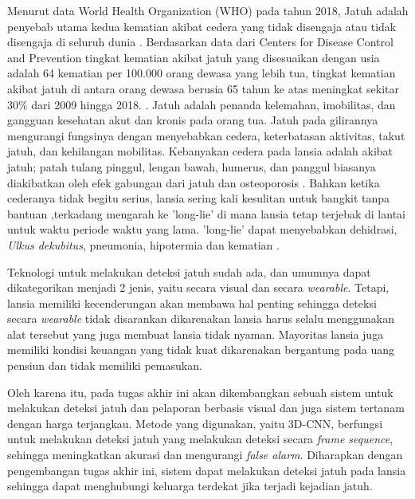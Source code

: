 Menurut data World Health Organization (WHO) pada tahun 2018, Jatuh adalah penyebab utama kedua kematian akibat cedera yang tidak disengaja atau tidak disengaja di seluruh dunia \cite{cit:5}. Berdasarkan data dari Centers for Disease Control and Prevention tingkat kematian akibat jatuh yang disesuaikan dengan usia adalah 64 kematian per 100.000 orang dewasa yang lebih tua, tingkat kematian akibat jatuh di antara orang dewasa berusia 65 tahun ke atas meningkat sekitar 30\% dari 2009 hingga 2018. \cite{cit:6}. Jatuh adalah penanda kelemahan, imobilitas, dan gangguan kesehatan akut dan kronis pada orang tua. Jatuh pada gilirannya mengurangi fungsinya dengan menyebabkan cedera, keterbatasan aktivitas, takut jatuh, dan kehilangan mobilitas. Kebanyakan cedera pada lansia adalah akibat jatuh; patah tulang pinggul, lengan bawah, humerus, dan panggul biasanya diakibatkan oleh efek gabungan dari jatuh dan osteoporosis \cite{cit:7}. Bahkan ketika cederanya tidak begitu serius, lansia sering kali kesulitan untuk bangkit tanpa bantuan \cite{cit:8},terkadang mengarah ke 'long-lie' di mana lansia tetap terjebak di lantai untuk waktu periode waktu yang lama. 'long-lie' dapat menyebabkan dehidrasi, \textit{Ulkus dekubitus}, pneumonia, hipotermia dan kematian \cite{cit:9}.
 \vspace{1ex} 

Teknologi untuk melakukan deteksi jatuh sudah ada, dan umumnya dapat dikategorikan menjadi 2 jenis, yaitu secara visual dan secara \textit{wearable}. Tetapi, lansia memiliki kecenderungan akan membawa hal penting sehingga deteksi secara \textit{wearable} tidak disarankan dikarenakan lansia harus selalu menggunakan alat tersebut yang juga membuat lansia tidak nyaman. Mayoritas lansia juga memiliki kondisi keuangan yang tidak kuat dikarenakan bergantung pada uang pensiun dan tidak memiliki pemasukan.
\vspace{1ex} 

Oleh karena itu, pada tugas akhir ini akan dikembangkan sebuah sistem untuk melakukan deteksi jatuh dan pelaporan berbasis visual dan juga sistem tertanam dengan harga terjangkau. Metode yang digunakan, yaitu 3D-CNN, berfungsi untuk melakukan deteksi jatuh yang melakukan deteksi secara \textit{frame sequence}, sehingga meningkatkan akurasi dan mengurangi \textit{false alarm}. Diharapkan dengan pengembangan tugas akhir ini, sistem dapat melakukan deteksi jatuh pada lansia sehingga dapat menghubungi keluarga terdekat jika terjadi kejadian jatuh. 
\vspace{1ex} 

